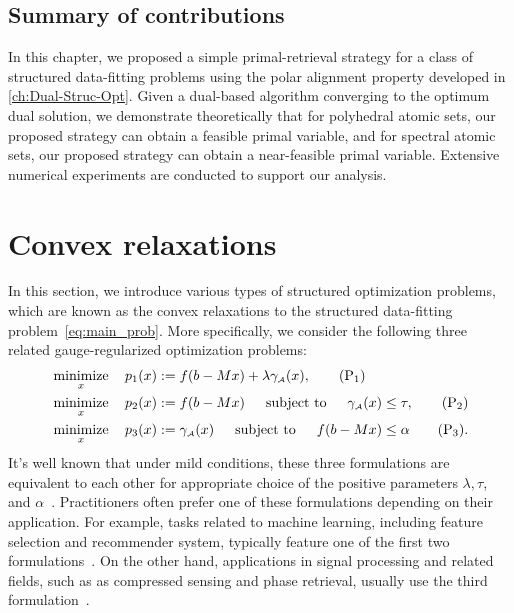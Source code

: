 \subsection{Summary of contributions}

In this chapter, we proposed a simple primal-retrieval strategy for a class of structured data-fitting problems using the polar alignment property developed in \autoref{ch:Dual-Struc-Opt}. Given a dual-based algorithm converging to the optimum dual solution, we demonstrate theoretically that for polyhedral atomic sets, our proposed strategy can obtain a feasible primal variable, and for spectral atomic sets, our proposed strategy can obtain a near-feasible primal variable. Extensive numerical experiments are conducted to support our analysis. 


\section{Convex relaxations}
\label{sec:4-2}

In this section, we introduce various types of structured optimization problems, which are known as the convex relaxations to the structured data-fitting problem~\eqref{eq:main_prob}. More specifically, 
we consider the following three related gauge-regularized optimization
problems:
\begin{align} 
  & \displaystyle\mathop{\hbox{\rm minimize}}_{x}\enspace\enspace p_1(x) := f(b - Mx) + \lambda\gamma_{\scriptscriptstyle\mathcal{A}}(x), \label{prob:primal1} \tag{P$_1$} \\
  & \displaystyle\mathop{\hbox{\rm minimize}}_{x}\enspace\enspace p_2(x) := f(b - Mx) \enspace\hbox{\quad subject to\quad}\enspace \gamma_{\scriptscriptstyle\mathcal{A}}(x) \leq \tau, \label{prob:primal2} \tag{P$_2$} \\
  & \displaystyle\mathop{\hbox{\rm minimize}}_{x}\enspace\enspace p_3(x) := \gamma_{\scriptscriptstyle\mathcal{A}}(x)  \enspace\hbox{\quad subject to\quad}\enspace f(b - Mx) \leq \alpha \label{prob:primal3} \tag{P$_3$}. 
\end{align}
It's well known that under mild conditions, these three formulations are equivalent to each other for appropriate choice of the positive parameters $\lambda, \tau$, and $\alpha$~\cite{FrieTsen:2006}. Practitioners often prefer one of these formulations depending on their application. For example, tasks related to machine learning, including feature selection and recommender system, typically feature one of the first two formulations~\cite{tibshirani1996regression,yul06,Meinshausen06}.  On the other hand, applications in signal processing and related fields, such as as compressed sensing and phase retrieval, usually use the third formulation~\cite{berg2008probing,candes:2013}. 

